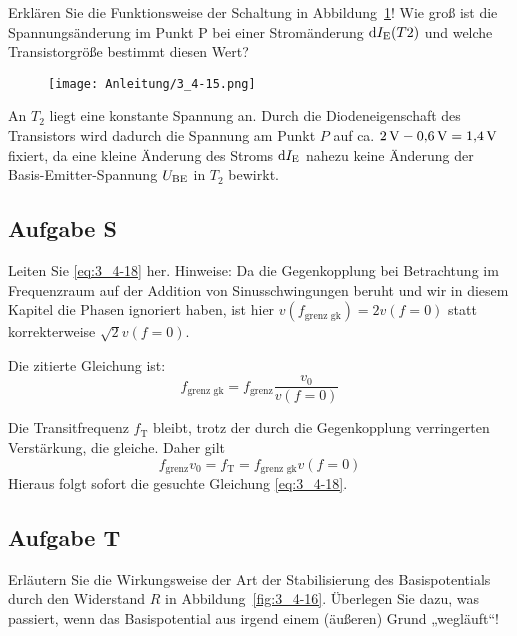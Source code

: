 \begin{problem}
    Erklären Sie die Funktionsweise der Schaltung in
    Abbildung~\ref{fig:3_4-15}! Wie groß ist die Spannungsänderung im Punkt P
    bei einer Stromänderung $\dif  \IE(T2)$ und welche
    Transistorgröße bestimmt diesen Wert?
\end{problem}

\begin{figure}[htbp]
    \centering
    \texttt{[image: Anleitung/3\_4-15.png]}
    \caption{%
        \cite[Abbildung~3/4.15]{physik313-Anleitung}
    }
    \label{fig:3_4-15}
\end{figure}

An $T_2$ liegt eine konstante Spannung an. Durch die Diodeneigenschaft des
Transistors wird dadurch die Spannung am Punkt $P$ auf ca. $\SI 2{\volt} -
\SI{0.6}{\volt} = \SI{1.4}{\volt}$ fixiert, da eine kleine Änderung des Stroms
$\dif\IE$ nahezu keine Änderung der Basis-Emitter-Spannung $U_\text{BE}$ in $T_2$
bewirkt.

\FloatBarrier
\subsection{Aufgabe S}

\begin{problem}
    Leiten Sie \eqref{eq:3_4-18} her. Hinweise: Da die Gegenkopplung bei
    Betrachtung im Frequenzraum auf der Addition von Sinusschwingungen beruht
    und wir in diesem Kapitel die Phasen ignoriert haben, ist hier
    $v(f_\text{grenz gk}) = 2v(f=0)$ statt korrekterweise $\sqrt 2 v (f = 0)$.
\end{problem}

Die zitierte Gleichung ist:
\begin{equation}
    \label{eq:3_4-18}
    f_\text{grenz gk} = f_\text{grenz} \frac{v_0}{v(f=0)}
\end{equation}

Die Transitfrequenz $f_\text{T}$ bleibt, trotz der durch die Gegenkopplung
verringerten Verstärkung, die gleiche. Daher gilt
\[f_\text{grenz}v_0 = f_\text{T} = f_\text{grenz gk} v(f=0)\]
Hieraus folgt sofort die gesuchte Gleichung \eqref{eq:3_4-18}.

\FloatBarrier
\subsection{Aufgabe T}

\begin{problem}
    Erläutern Sie die Wirkungsweise der Art der Stabilisierung des
    Basispotentials durch den Widerstand $R$ in Abbildung~\ref{fig:3_4-16}.
    Überlegen Sie dazu, was passiert, wenn das Basispotential aus irgend einem
    (äußeren) Grund „wegläuft“!
\end{problem}

